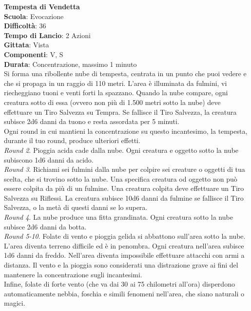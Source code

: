 \begin{multicols}{2}
\medskip\textbf{Tempesta di Vendetta}\\
\textbf{Scuola}: Evocazione\\
\textbf{Difficoltà}: 36\\
\textbf{Tempo di Lancio}: 2 Azioni\\
\textbf{Gittata}: Vista\\
\textbf{Componenti}: V, S\\
\textbf{Durata}: Concentrazione, massimo 1 minuto\\
Si forma una ribollente nube di tempesta, centrata in un punto che puoi vedere e che si propaga in un raggio di 110 metri. L'area è illuminata da fulmini, vi riecheggiano tuoni e venti forti la spazzano. Quando la nube compare, ogni creatura sotto di essa (ovvero non più di 1.500 metri sotto la nube) deve effettuare un Tiro Salvezza su Tempra. Se fallisce il Tiro Salvezza, la creatura subisce 2d6 danni da tuono e resta assordata per 5 minuti.\\
Ogni round in cui mantieni la concentrazione su questo incantesimo, la tempesta, durante il tuo round, produce ulteriori effetti.\\
\textit{Round 2}. Pioggia acida cade dalla nube. Ogni creatura e oggetto sotto la nube subiscono 1d6 danni da acido.\\
\textit{Round 3}. Richiami sei fulmini dalla nube per colpire sei creature o oggetti di tua scelta, che si trovino sotto la nube. Una specifica creatura od oggetto non può essere colpita da più di un fulmine. Una creatura colpita deve effettuare un Tiro Salvezza su Riflessi. La creatura subisce 10d6 danni da fulmine se fallisce il Tiro Salvezza, o la metà di questi danni se lo supera. \\
\textit{Round 4}. La nube produce una fitta grandinata. Ogni creatura sotto la nube subisce 2d6 danni da botta.\\
\textit{Round 5-10}. Folate di vento e pioggia gelida si abbattono sull'area sotto la nube. L'area diventa terreno difficile ed è in penombra. Ogni creatura nell'area subisce 1d6 danni da freddo. Nell'area diventa impossibile effettuare attacchi con armi a distanza. Il vento e la pioggia sono considerati una distrazione grave ai fini del mantenere la concentrazione sugli incantesimi.\\ Infine, folate di forte vento (che va dai 30 ai 75 chilometri all'ora) disperdono automaticamente nebbia, foschia e simili fenomeni nell'area, che siano naturali o magici.


\end{multicols}

